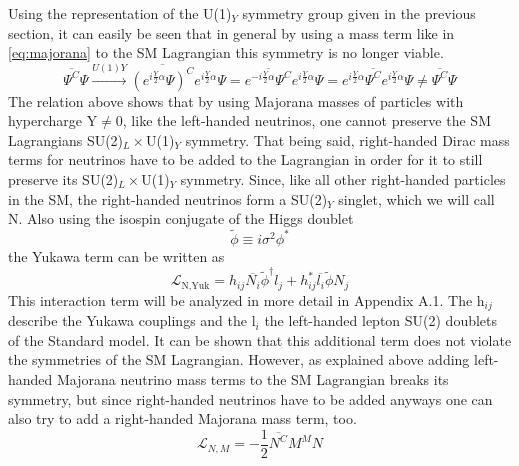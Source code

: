 Using the representation of the U(1)$_Y$ symmetry group given in the previous section, it can easily be seen that in general by using a mass term like in \ref{eq:majorana} to the SM Lagrangian this symmetry is no longer viable.
\begin{equation*}
	\overline{\Psi^C}\Psi \overset{U(1)Y}{\longrightarrow}\overline{(e^{i\frac{Y}{2}\alpha}\Psi)^C}e^{i\frac{Y}{2}\alpha}\Psi=\overline{e^{-i\frac{Y}{2}\alpha}\Psi^C}e^{i\frac{Y}{2}\alpha}\Psi=e^{i\frac{Y}{2}\alpha}\overline{\Psi^C}e^{i\frac{Y}{2}\alpha}\Psi\neq	\overline{\Psi^C}\Psi
\end{equation*}
The relation above shows that by using Majorana masses of particles with hypercharge Y$\neq$0, like the left-handed neutrinos, one cannot preserve the SM Lagrangians SU(2)$_L\times$U(1)$_Y$ symmetry. 
\newline
That being said, right-handed Dirac mass terms for neutrinos have to be added to the Lagrangian in order for it to still preserve its SU(2)$_L\times$U(1)$_Y$ symmetry. Since, like all other right-handed particles in the SM, the right-handed neutrinos form a SU(2)$_Y$ singlet, which we will call N. Also using the isospin conjugate of the Higgs doublet 
\begin{equation*}
	\tilde{\phi}\equiv i\sigma^2\phi^*
\end{equation*}
the Yukawa term can be written as
\begin{equation}
	\mathcal{L}_{\text{N,Yuk}}=h_{ij}\overline{N_i}\tilde{\phi}^\dagger l_j +h_{ij}^* \overline{l_i}\tilde{\phi} N_j
	\label{eq:Yukterm}
\end{equation}
This interaction term will be analyzed in more detail in Appendix A.1. \newline
The h$_{ij}$ describe the Yukawa couplings and the l$_i$ the left-handed lepton SU(2) doublets of the Standard model. It can be shown that this additional term does not violate the symmetries of the SM Lagrangian. \newline
However, as explained above adding left-handed Majorana neutrino mass terms to the SM Lagrangian breaks its symmetry, but since right-handed neutrinos have to be added anyways one can also try to add a right-handed Majorana mass term, too.
\begin{equation}
\mathcal{L}_{N,M}=-\frac{1}{2}\overline{N^C}M^MN
\label{eq:neutrino_majorana}
\end{equation}

